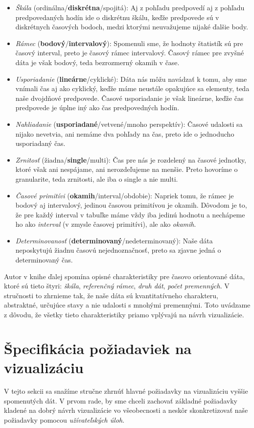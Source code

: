 \begin{itemize}
	\item \textit{Škála} (ordinálna/\textbf{diskrétna}/spojitá): Aj z pohľadu predpovedí aj z pohľadu predpovedaných hodín ide o diskrétnu škálu, keďže predpovede sú v diskrétnych časových bodoch, medzi ktorými neuvažujeme nijaké ďalšie body.
	\item \textit{Rámec} (\textbf{bodový}/\textbf{intervalový}): Spomenuli sme, že hodnoty štatistík sú pre časový interval, preto je časový rámec intervalový. Časový rámec pre zvyšné dáta je však bodový, teda bezrozmerný okamih v čase. 
	\item \textit{Usporiadanie} (\textbf{lineárne}/cyklické): Dáta nás môžu navádzať k tomu, aby sme vnímali čas aj ako cyklický, keďže máme neustále opakujúce sa elementy, teda naše dvojdňové predpovede. Časové usporiadanie je však lineárne, keďže čas predpovede je úplne iný ako čas predpovedných hodín.
	\item \textit{Nahliadanie} (\textbf{usporiadané}/vetvené/mnoho perspektív): Časové udalosti sa nijako nevetvia, ani nemáme dva pohľady na čas, preto ide o jednoducho usporiadaný čas.
	\item \textit{Zrnitosť} (žiadna/\textbf{single}/multi): Čas pre nás je rozdelený na časové jednotky, ktoré však ani nespájame, ani nerozdeľujeme na menšie. Preto hovoríme o granularite, teda zrnitosti, ale iba o single a nie multi.
	\item \textit{Časové primitívi} (\textbf{okamih}/interval/obdobie): Napriek tomu, že rámec je bodový aj intervalový, jedinou časovou primitívou je okamih. Dôvodom je to, že pre každý interval v tabuľke máme vždy iba jedinú hodnotu a nechápeme ho ako \textit{interval} (v zmysle časovej primitívi), ale ako \textit{okamih}.
	\item \textit{Determinovanosť} (\textbf{determinovaný}/nedeterminovaný): Naše dáta neposkytujú žiadnu časovú nejednoznačnosť, preto sa zjavne jedná o determinovaný čas.
\end{itemize}

Autor v knihe ďalej spomína opisné charakteristiky pre časovo orientované dáta, ktoré sú tieto štyri: \textit{škála}, \textit{referenčný rámec}, \textit{druh dát}, \textit{počet premenných}. V stručnosti to zhrnieme tak, že naše dáta sú kvantitatívneho charakteru, abstraktné, určujúce stavy a nie udalosti s mnohými premennými. Toto uvádzame z dôvodu, že všetky tieto charakteristiky priamo vplývajú na návrh vizualizácie. 

\section{Špecifikácia požiadaviek na vizualizáciu}
\label{sec:spec}
V tejto sekcii sa snažíme stručne zhrnúť hlavné požiadavky na vizualizáciu vyššie spomenutých dát. V prvom rade, by sme chceli zachovať základné požiadavky kladené na dobrý návrh vizualizácie vo všeobecnosti a neskôr skonkretizovať naše požiadavky pomocou \textit{užívateľských úloh}.

